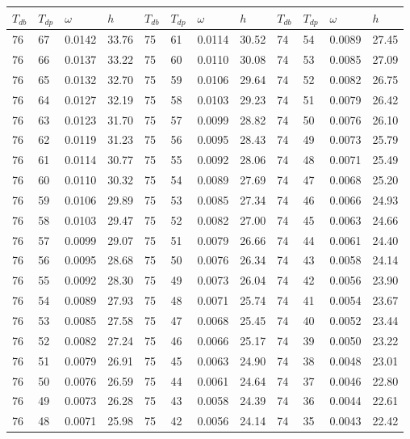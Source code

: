 \begin{tabular}{llll|llll|llll}
 \toprule 
\(T_{db}\) & \(T_{dp}\) & \(\omega\) & \(h\) & \(T_{db}\) & \(T_{dp}\) & \(\omega\) & \(h\) & \(T_{db}\) & \(T_{dp}\) & \(\omega\) & \(h\)  \\ \midrule 
76 & 67 & 0.0142 & 33.76 & 75 & 61 & 0.0114 & 30.52 & 74 & 54 & 0.0089 & 27.45\\
76 & 66 & 0.0137 & 33.22 & 75 & 60 & 0.0110 & 30.08 & 74 & 53 & 0.0085 & 27.09\\
76 & 65 & 0.0132 & 32.70 & 75 & 59 & 0.0106 & 29.64 & 74 & 52 & 0.0082 & 26.75\\
76 & 64 & 0.0127 & 32.19 & 75 & 58 & 0.0103 & 29.23 & 74 & 51 & 0.0079 & 26.42\\
76 & 63 & 0.0123 & 31.70 & 75 & 57 & 0.0099 & 28.82 & 74 & 50 & 0.0076 & 26.10\\
76 & 62 & 0.0119 & 31.23 & 75 & 56 & 0.0095 & 28.43 & 74 & 49 & 0.0073 & 25.79\\
76 & 61 & 0.0114 & 30.77 & 75 & 55 & 0.0092 & 28.06 & 74 & 48 & 0.0071 & 25.49\\
76 & 60 & 0.0110 & 30.32 & 75 & 54 & 0.0089 & 27.69 & 74 & 47 & 0.0068 & 25.20\\
76 & 59 & 0.0106 & 29.89 & 75 & 53 & 0.0085 & 27.34 & 74 & 46 & 0.0066 & 24.93\\
76 & 58 & 0.0103 & 29.47 & 75 & 52 & 0.0082 & 27.00 & 74 & 45 & 0.0063 & 24.66\\
76 & 57 & 0.0099 & 29.07 & 75 & 51 & 0.0079 & 26.66 & 74 & 44 & 0.0061 & 24.40\\
76 & 56 & 0.0095 & 28.68 & 75 & 50 & 0.0076 & 26.34 & 74 & 43 & 0.0058 & 24.14\\
76 & 55 & 0.0092 & 28.30 & 75 & 49 & 0.0073 & 26.04 & 74 & 42 & 0.0056 & 23.90\\
76 & 54 & 0.0089 & 27.93 & 75 & 48 & 0.0071 & 25.74 & 74 & 41 & 0.0054 & 23.67\\
76 & 53 & 0.0085 & 27.58 & 75 & 47 & 0.0068 & 25.45 & 74 & 40 & 0.0052 & 23.44\\
76 & 52 & 0.0082 & 27.24 & 75 & 46 & 0.0066 & 25.17 & 74 & 39 & 0.0050 & 23.22\\
76 & 51 & 0.0079 & 26.91 & 75 & 45 & 0.0063 & 24.90 & 74 & 38 & 0.0048 & 23.01\\
76 & 50 & 0.0076 & 26.59 & 75 & 44 & 0.0061 & 24.64 & 74 & 37 & 0.0046 & 22.80\\
76 & 49 & 0.0073 & 26.28 & 75 & 43 & 0.0058 & 24.39 & 74 & 36 & 0.0044 & 22.61\\
76 & 48 & 0.0071 & 25.98 & 75 & 42 & 0.0056 & 24.14 & 74 & 35 & 0.0043 & 22.42\\

\end{tabular}
